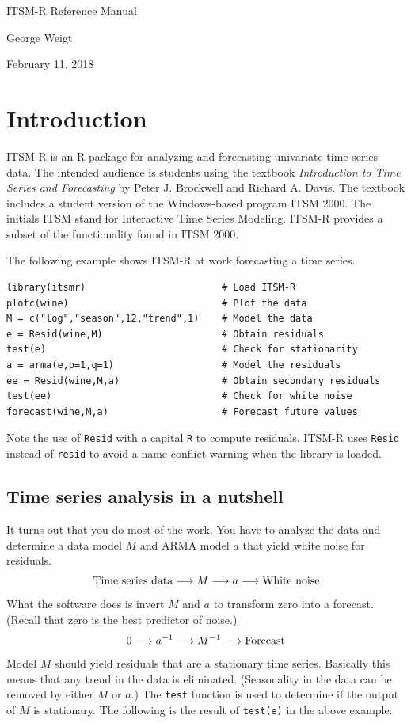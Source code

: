 \documentclass[11pt]{article}
\begin{document}
\begin{center}
{\LARGE ITSM-R Reference Manual}

George Weigt

February 11, 2018
\end{center}

\tableofcontents

\newpage

\section{Introduction}
ITSM-R is an R package for analyzing and forecasting univariate
time series data.
The intended audience is students using the textbook
{\it Introduction to Time Series and Forecasting}
by Peter J. Brockwell and Richard A. Davis.
The textbook includes a student version of the Windows-based program ITSM 2000.
The initials ITSM stand for Interactive Time Series Modeling.
ITSM-R provides a subset of the functionality found in ITSM 2000.

The following example shows ITSM-R at work forecasting a time series.

\begin{Verbatim}
library(itsmr)                        # Load ITSM-R
plotc(wine)                           # Plot the data
M = c("log","season",12,"trend",1)    # Model the data
e = Resid(wine,M)                     # Obtain residuals
test(e)                               # Check for stationarity
a = arma(e,p=1,q=1)                   # Model the residuals
ee = Resid(wine,M,a)                  # Obtain secondary residuals
test(ee)                              # Check for white noise
forecast(wine,M,a)                    # Forecast future values
\end{Verbatim}

Note the use of {\tt Resid} with a capital {\tt R} to compute residuals.
ITSM-R uses {\tt Resid} instead of {\tt resid} to avoid a name conflict
warning when the library is loaded.

\subsection{Time series analysis in a nutshell}
It turns out that you do most of the work.
You have to analyze the data and
determine a data model $M$ and ARMA model $a$
that yield white noise for residuals.
\[
\hbox{Time series data}
\longrightarrow M\longrightarrow a\longrightarrow
\hbox{White noise}
\]
What the software does is invert $M$ and $a$ to transform zero into a forecast.
(Recall that zero is the best predictor of noise.)
\[
0\longrightarrow a^{-1}\longrightarrow M^{-1}\longrightarrow{\rm Forecast}
\]
Model $M$ should yield residuals that are a stationary time series.
Basically this means that any trend in the data is eliminated.
(Seasonality in the data can be removed by either $M$ or $a$.)
The {\tt test} function is used to determine if the output of $M$ is stationary.
The following is the result of {\tt test(e)} in the above example.
\end{document}
